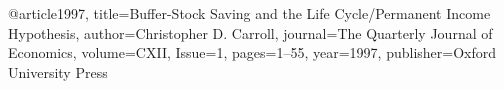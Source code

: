 @article{1997,
  title={Buffer-Stock Saving and the Life Cycle/Permanent Income Hypothesis},
  author={Christopher D. Carroll},
  journal={The Quarterly Journal of Economics},
  volume={CXII},
  Issue={1},
  pages={1--55},
  year={1997},
  publisher={Oxford University Press}
}